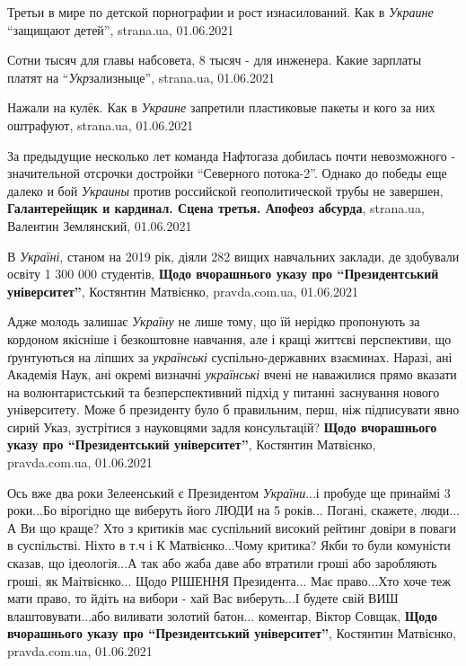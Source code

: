 Третьи в мире по детской порнографии и рост изнасилований. Как в \emph{Украине}
\enquote{защищают детей}, strana.ua, 01.06.2021

Сотни тысяч для главы набсовета, 8 тысяч - для инженера. Какие зарплаты платят
на \enquote{\emph{Укр}зализныце}, strana.ua, 01.06.2021

Нажали на кулёк. Как в \emph{Украине} запретили пластиковые пакеты и кого за
них оштрафуют, strana.ua, 01.06.2021

За предыдущие несколько лет команда Нафтогаза добилась почти невозможного -
значительной отсрочки достройки \enquote{Северного потока-2}. Однако до победы еще
далеко и бой \emph{Украины} против российской геополитической трубы не завершен,
\textbf{Галантерейщик и кардинал. Сцена третья.  Апофеоз абсурда}, strana.ua, Валентин Землянский, 01.06.2021

В \emph{Україні}, станом на 2019 рік, діяли 282 вищих навчальних заклади, де здобували освіту 1 300 000 студентів, 
\textbf{Щодо вчорашнього указу про \enquote{Президентський університет}}, Костянтин Матвієнко, pravda.com.ua, 01.06.2021

Адже молодь залишає \emph{Україну} не лише тому, що їй нерідко пропонують за кордоном
якісніше і безкоштовне навчання, але і кращі життєві перспективи, що
ґрунтуються на ліпших за \emph{українські} суспільно-державних взаєминах.  Наразі, ані
Академія Наук, ані окремі визначні \emph{українські} вчені не наважилися прямо вказати
на волюнтаристський та безперспективний підхід у питанні заснування нового
університету. Може б президенту було б правильним, перш, ніж підписувати явно
сирий Указ, зустрітися з науковцями задля консультацій?
\textbf{Щодо вчорашнього указу про \enquote{Президентський університет}}, Костянтин Матвієнко, pravda.com.ua, 01.06.2021

Ось вже два роки Зелеенський є Президентом \emph{України}...і пробуде ще принаймі 3
роки...Бо вірогідно ще виберуть його ЛЮДИ на 5 років... Погані, скажете,
люди... А Ви що краще? Хто з критиків має суспільний високий рейтинг довіри в
поваги в суспільстві. Ніхто в т.ч і К Матвієнко...Чому критика? Якби то були
комуністи сказав, що ідеологія...А так або жаба даве або втратили гроші або
заробляють гроші, як Маітвієнко... Щодо РІШЕННЯ Президента... Має право...Хто
хоче теж мати право, то йдіть на вибори - хай Вас виберуть...І будете свій ВИШ
влаштовувати...або виливати золотий батон...
коментар, Віктор Совщак, \textbf{Щодо вчорашнього указу про \enquote{Президентський університет}}, 
Костянтин Матвієнко, pravda.com.ua, 01.06.2021

